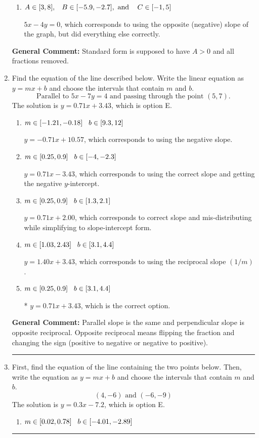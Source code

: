 \documentclass{extbook}[14pt]
\newcommand{\litem}[1]{\item #1

\rule{\textwidth}{0.4pt}}
\begin{document}
\begin{enumerate}
{\begin{enumerate}[label=\Alph*.]
 $1.25x + 1y = 0.0$, which corresponds to not removing rational values for Standard Form.
\item \( A \in [3, 8], \hspace{3mm} B \in [-5.9, -2.7], \text{ and } \hspace{3mm} C \in [-1, 5] \)

 $5x - 4y = 0$, which corresponds to using the opposite (negative) slope of the graph, but did everything else correctly.
\end{enumerate}

\textbf{General Comment:} Standard form is supposed to have $A > 0$ and all fractions removed.
}
\litem{
Find the equation of the line described below. Write the linear equation as $ y=mx+b $ and choose the intervals that contain $m$ and $b$.
\[ \text{Parallel to } 5 x - 7 y = 4 \text{ and passing through the point } (5, 7). \]The solution is \( y = 0.71x + 3.43 \), which is option E.\begin{enumerate}[label=\Alph*.]
\item \( m \in [-1.21, -0.18] \hspace*{3mm} b \in [9.3, 12] \)

 $y = -0.71x + 10.57$, which corresponds to using the negative slope.
\item \( m \in [0.25, 0.9] \hspace*{3mm} b \in [-4, -2.3] \)

 $y = 0.71x - 3.43$, which corresponds to using the correct slope and getting the negative $y$-intercept.
\item \( m \in [0.25, 0.9] \hspace*{3mm} b \in [1.3, 2.1] \)

 $y = 0.71x + 2.00$, which corresponds to correct slope and mis-distributing while simplifying to slope-intercept form.
\item \( m \in [1.03, 2.43] \hspace*{3mm} b \in [3.1, 4.4] \)

 $y = 1.40x + 3.43$, which corresponds to using the reciprocal slope $(1/m)$.
\item \( m \in [0.25, 0.9] \hspace*{3mm} b \in [3.1, 4.4] \)

* $y = 0.71x + 3.43$, which is the correct option.
\end{enumerate}

\textbf{General Comment:} Parallel slope is the same and perpendicular slope is opposite reciprocal. Opposite reciprocal means flipping the fraction and changing the sign (positive to negative or negative to positive).
}
\litem{
First, find the equation of the line containing the two points below. Then, write the equation as $ y=mx+b $ and choose the intervals that contain $m$ and $b$.
\[ (4, -6) \text{ and } (-6, -9) \]The solution is \( y = 0.3x -7.2 \), which is option E.\begin{enumerate}[label=\Alph*.]
\item \( m \in [0.02, 0.78] \hspace*{3mm} b \in [-4.01, -2.89] \)


\end{enumerate}}
\end{enumerate}
\end{document}
